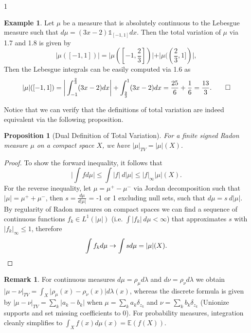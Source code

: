 \documentclass[12pt]{article}
\newtheorem{proposition}[theorem]{Proposition}
\theoremstyle{definition}
\newtheorem*{example}{Example}
\newtheorem*{remark}{Remark}
\theoremstyle{plain}
\begin{document}
\begin{spacing}{1}
\begin{example}
    Let $\mu$ be a measure that is absolutely continuous to the Lebesgue measure such that $d\mu = (3x -2) \mathds{1}_{[-1, 1]}dx$. Then the total variation of $\mu$ via 1.7 and 1.8 is given by 
    \[
    \lvert \mu([-1, 1]) \rvert = \lvert \mu([-1, \frac{2}{3}])| + \lvert \mu((\frac{2}{3}, 1]) \rvert,
    \]
    Then the Lebesgue integrals can be easily computed via 1.6 as
    \[
    \lvert \mu \rvert ([-1, 1]) =  \bigg \lvert \displaystyle \int_{-1}^{\frac{2}{3}} (3x-2)dx \bigg \rvert + \displaystyle \int_{\frac{2}{3}}^1 (3x-2)dx = \frac{25}{6}+\frac{1}{6} = \frac{13}{3}. \hfill \tag*{\(\square\)}
    \]
\end{example}

Notice that we can verify that the definitions of total variation are indeed equivalent via the following proposition.

\begin{proposition}[Dual Definition of Total Variation]
    For a finite signed Radon measure $\mu$ on a compact space $X$, we have $\lvert \mu \rvert_{TV} = \lvert \mu \rvert (X)$.
\end{proposition}

\begin{proof}
    To show the forward inequality, it follows that
    \[
    \bigg \lvert \displaystyle \int f d\mu \bigg \rvert \leq \displaystyle \int \lvert f \rvert \ d \lvert \mu \rvert \leq \lvert f \rvert_\infty \lvert \mu \rvert (X).
    \]
    For the reverse inequality, let $\mu = \mu^+ - \mu^-$ via Jordan decomposition such that $\lvert \mu \rvert = \mu^+ + \mu^-$, then $s = \frac{d\mu}{d\lvert \mu \rvert}$ = -1 or 1 excluding null sets, such that $d \mu = s \ d \lvert \mu \rvert$. By regularity of Radon measures on compact spaces we can find a sequence of continuous functions $f_k \in L^1 (\lvert \mu \rvert)$ (i.e. $\displaystyle \int \lvert f_k \rvert \ d\mu < \infty$) that approximates $s$ with $\lvert f_k \rvert_\infty \leq 1$, therefore
    \[
    \displaystyle \int f_k d\mu \rightarrow \displaystyle \int s d\mu = \lvert \mu \rvert (X) . \qedhere
    \]   
\end{proof}

\begin{remark}
    For continuous measures $d\mu = \rho_\mu d\lambda$ and $d\nu = \rho_\nu d\lambda$ we obtain $\lvert \mu - \nu \rvert_{TV} = \displaystyle \int_X \lvert \rho_\mu(x) - \rho_\nu(x) \rvert d\lambda(x)$, whereas the discrete formula is given by $\lvert \mu - \nu \rvert_{TV} = \sum_{k} \lvert a_k - b_k \rvert$ when $\mu = \sum_k a_k \delta_{z_k}$ and $\nu = \sum_k b_k \delta_{z_k}$ (Unionize supports and set missing coefficients to 0).
    \newline
    For probability measures, integration cleanly simplifies to $\displaystyle \int_X f(x) d\mu(x) = \mathbb{E}(f(X))$.
\end{remark}



\end{spacing}
\end{document}
